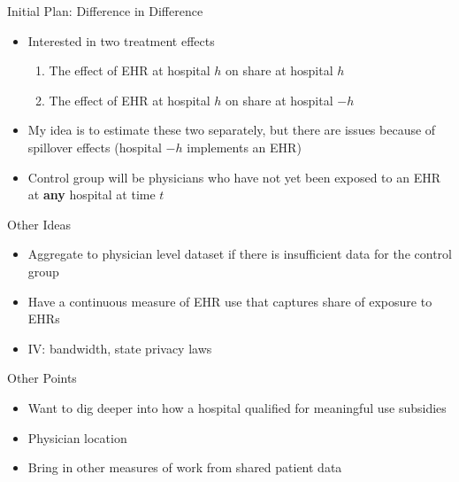 \documentclass[10pt]{beamer}
\begin{document}
\begin{frame}{Initial Plan: Difference in Difference}
\begin{itemize}
    \item Interested in two treatment effects
    \begin{enumerate}
        \item The effect of EHR at hospital $h$ on share at hospital $h$
        \item The effect of EHR at hospital $h$ on share at hospital $-h$
    \end{enumerate}
    
    \vspace{2mm}
    
    \item My idea is to estimate these two separately, but there are issues because of spillover effects (hospital $-h$ implements an EHR)
    
    \vspace{2mm}
    
    \item Control group will be physicians who have not yet been exposed to an EHR at \textbf{any} hospital at time $t$
\end{itemize}
\end{frame}

\begin{frame}{Other Ideas}
\begin{itemize}
    \item Aggregate to physician level dataset if there is insufficient data for the control group
    \item Have a continuous measure of EHR use that captures share of exposure to EHRs
    \item IV: bandwidth, state privacy laws
\end{itemize}
\end{frame}

\begin{frame}{Other Points}
\begin{itemize}
    \item Want to dig deeper into how a hospital qualified for meaningful use subsidies
    \item Physician location
    \item Bring in other measures of work from shared patient data
\end{itemize}
    
\end{frame}
\end{document}
